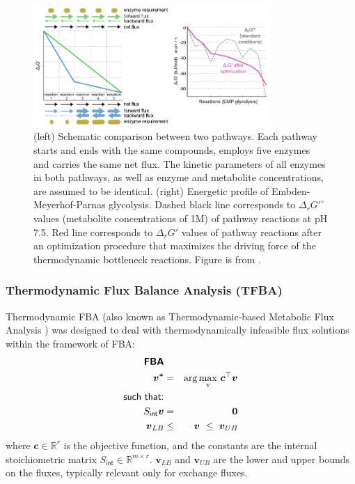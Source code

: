 \documentclass[10pt,a4paper]{article}
\newcommand{\mymatrix}[1]{#1}
\newcommand{\myvector}[1]{{\boldsymbol{#1}}}
\newcommand{\stoichmatint}{\mymatrix{S}_{\mathsf{int}}}
\begin{document}
\begin{figure}[ht!]
	\begin{center}
		\includegraphics[width=0.8\textwidth]{mdf}
		\caption{(left) Schematic comparison between two pathways. Each pathway starts and ends with the same compounds, employs five enzymes and carries the same net flux. The kinetic parameters of all enzymes in both pathways, as well as enzyme and metabolite concentrations, are assumed to be identical. (right) Energetic profile of Embden-Meyerhof-Parnas glycolysis. Dashed black line corresponds to $\Delta_r G'^\circ$ values (metabolite concentrations of 1M) of pathway reactions at pH 7.5. Red line corresponds to $\Delta_r G'$ values of pathway reactions after an optimization procedure that maximizes the driving force of the thermodynamic bottleneck reactions. Figure is from \textcite{noor_pathway_2014}.
		}\label{fig:mdf}
	\end{center}
\end{figure}

\subsubsection{Thermodynamic Flux Balance Analysis (TFBA)}

Thermodynamic FBA (also known as Thermo\-dynamic-based Metabolic Flux Analysis \cite{henry_thermodynamics-based_2007}) was designed to deal with thermodynamically infeasible flux solutions within the framework of FBA:
\begin{eqnarray}
\textsf{\textbf{FBA}} && \nonumber\\
\myvector{v^*} &=& \mathrm{arg\max_v} {~\myvector{c}^\top\myvector{v}}\nonumber\\
\textsf{such that:} && \nonumber\\
\stoichmatint \myvector{v} &=& \myvector{0}  \label{eq:fba1} \\
\myvector{v}_{LB} &\leq& \myvector{v} ~\leq~ \myvector{v}_{UB} \label{eq:fba2}
\end{eqnarray}
where $\myvector{c} \in \mathbb{R}^r$ is the objective function, and the constants are the internal stoichiometric matrix $\stoichmatint \in \mathbb{R}^{m \times r}$. $\myvector{v}_{LB}$ and $\myvector{v}_{UB}$ are the lower and upper bounds on the fluxes, typically relevant only for exchange fluxes.
\end{document}
